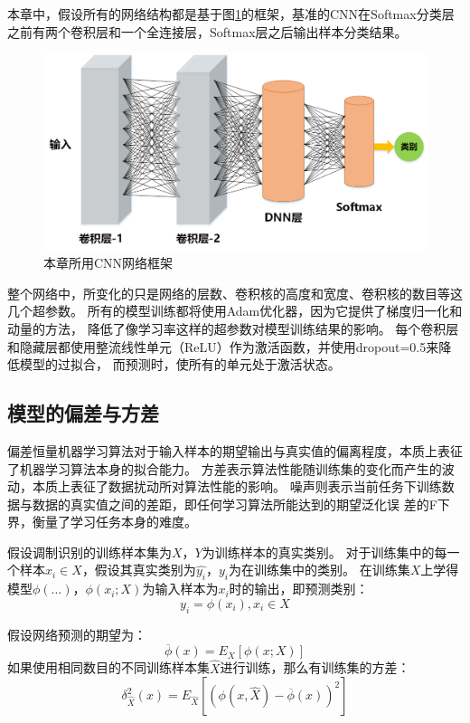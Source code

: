 本章中，假设所有的网络结构都是基于图\ref{fig_5_0}的框架，基准的CNN在Softmax分类层之前有两个卷积层和一个全连接层，Softmax层之后输出样本分类结果。\par
\begin{figure}[!htbp]
	\centering
	\includegraphics[scale=0.6]{figures/chapter_5/fig_5_0}
	\caption{本章所用CNN网络框架}
	\label{fig_5_0}
\end{figure}

整个网络中，所变化的只是网络的层数、卷积核的高度和宽度、卷积核的数目等这几个超参数。
所有的模型训练都将使用Adam优化器，因为它提供了梯度归一化和动量的方法，
降低了像学习率这样的超参数对模型训练结果的影响。
每个卷积层和隐藏层都使用整流线性单元（ReLU）作为激活函数，并使用dropout=0.5来降低模型的过拟合，
而预测时，使所有的单元处于激活状态。\par

\subsection{模型的偏差与方差}
\label{sec_5_2_1}
偏差恒量机器学习算法对于输入样本的期望输出与真实值的偏离程度，本质上表征了机器学习算法本身的拟合能力。
方差表示算法性能随训练集的变化而产生的波动，本质上表征了数据扰动所对算法性能的影响。
噪声则表示当前任务下训练数据与数据的真实值之间的差距，即任何学习算法所能达到的期望泛化误
差的F下界，衡量了学习任务本身的难度。\par

假设调制识别的训练样本集为$X$，$Y$为训练样本的真实类别。
对于训练集中的每一个样本$x_i \in X$，假设其真实类别为$\hat{y_i}$，$y_i$为在训练集中的类别。
在训练集$X$上学得模型$\phi(\dots)$，$\phi(x_i; X)$为输入样本为$x_i$时的输出，即预测类别：
\begin{equation}
	\label{eqt_5_2}
	y_i = \phi(x_i), x_i \in X
\end{equation}

假设网络预测的期望为：
\begin{equation}
	\label{eqt_5_3}
	\overline{\phi}(x) = E_X\left[ \phi(x; X) \right]
\end{equation}
如果使用相同数目的不同训练样本集$\hat{X}$进行训练，那么有训练集的方差：
\begin{equation}
	\label{eqt_5_4}
	\delta_{\hat{X}}^2(x) = E_{\hat{X}}\left[ (\phi(x, \hat{X}) - \overline{\phi}(x))^2\right]
\end{equation}

